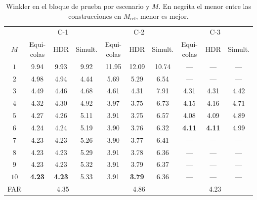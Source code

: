 \begin{table}[H]
\centering\small
\setlength{\tabcolsep}{4pt}
\caption{Winkler en el bloque de prueba por escenario y $M$. En negrita el menor entre las construcciones en $M_{\mathrm{ref}}$, menor es mejor.}
\label{tab:res_bloqueB_por_M}
\begin{tabular}{c ccc ccc ccc}
\hline
 & \multicolumn{3}{c}{C-1} & \multicolumn{3}{c}{C-2} & \multicolumn{3}{c}{C-3} \\
$M$ & Equi-colas & HDR & Simult. & Equi-colas & HDR & Simult. & Equi-colas & HDR & Simult. \\
\hline
$1$ & 9.94 & 9.93 & 9.92 & 11.95 & 12.09 & 10.74 & --- & --- & --- \\
$2$ & 4.98 & 4.94 & 4.44 & 5.69 & 5.29 & 6.54 & --- & --- & --- \\
$3$ & 4.49 & 4.46 & 4.68 & 4.61 & 4.31 & 7.91 & 4.31 & 4.31 & 4.42 \\
$4$ & 4.32 & 4.30 & 4.92 & 3.97 & 3.75 & 6.73 & 4.15 & 4.16 & 4.71 \\
$5$ & 4.27 & 4.26 & 5.11 & 3.91 & 3.75 & 6.57 & 4.08 & 4.09 & 4.89 \\
$6$ & 4.24 & 4.24 & 5.19 & 3.90 & 3.76 & 6.32 & \textbf{4.11} & \textbf{4.11} & 4.99 \\
$7$ & 4.23 & 4.23 & 5.26 & 3.90 & 3.77 & 6.41 & --- & --- & --- \\
$8$ & 4.23 & 4.23 & 5.29 & 3.91 & 3.78 & 6.36 & --- & --- & --- \\
$9$ & 4.23 & 4.23 & 5.32 & 3.91 & 3.79 & 6.37 & --- & --- & --- \\
$10$ & \textbf{4.23} & \textbf{4.23} & 5.33 & 3.91 & \textbf{3.79} & 6.36 & --- & --- & --- \\
\hline
FAR & \multicolumn{3}{c}{4.35} & \multicolumn{3}{c}{4.86} & \multicolumn{3}{c}{4.23} \\
\hline
\end{tabular}
\end{table}


